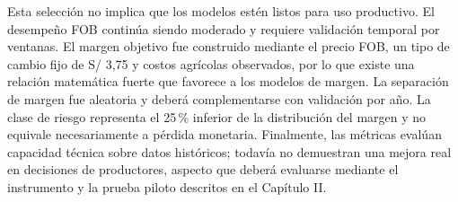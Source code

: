Esta selección no implica que los modelos estén listos para uso productivo. El desempeño FOB continúa siendo moderado y requiere validación temporal por ventanas. El margen objetivo fue construido mediante el precio FOB, un tipo de cambio fijo de S/ 3,75 y costos agrícolas observados, por lo que existe una relación matemática fuerte que favorece a los modelos de margen. La separación de margen fue aleatoria y deberá complementarse con validación por año. La clase de riesgo representa el 25\,\% inferior de la distribución del margen y no equivale necesariamente a pérdida monetaria. Finalmente, las métricas evalúan capacidad técnica sobre datos históricos; todavía no demuestran una mejora real en decisiones de productores, aspecto que deberá evaluarse mediante el instrumento y la prueba piloto descritos en el Capítulo II.
